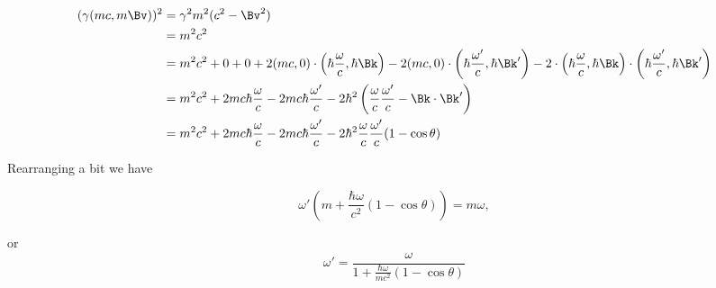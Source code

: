 \begin{align*}
(\gamma (m c, m \Bv) )^2 
&= \gamma^2 m^2 (c^2 - \Bv^2) \\
&= m^2 c^2 \\
&=
m^2 c^2 + 0 + 0
+ 2 (m c, 0) 
\cdot \left(\hbar \frac{\omega}{c}, \hbar \Bk \right)
- 2 (m c, 0) \cdot \left(\hbar \frac{\omega'}{c}, \hbar \Bk' \right)
- 2 
\cdot \left(\hbar \frac{\omega}{c}, \hbar \Bk \right)
\cdot \left(\hbar \frac{\omega'}{c}, \hbar \Bk' \right) \\
&=
m^2 c^2 + 2 m c \hbar \frac{\omega}{c} - 2 m c \hbar \frac{\omega'}{c}
- 2\hbar^2 \left(
\frac{\omega}{c} \frac{\omega'}{c}
- 
\Bk \cdot \Bk'
\right) \\
&=
m^2 c^2 + 2 m c \hbar \frac{\omega}{c} - 2 m c \hbar \frac{\omega'}{c}
- 2\hbar^2 
\frac{\omega}{c} \frac{\omega'}{c} (1 - \cos\theta)
\end{align*}

Rearranging a bit we have

\begin{equation}\label{eqn:relativisticElectrodynamicsExamReflection:430}
\omega' \left( m + \frac{\hbar \omega}{c^2} ( 1 - \cos\theta ) \right) = m \omega,
\end{equation}

or
\begin{equation}\label{eqn:relativisticElectrodynamicsExamReflection:450}
\omega' = \frac{\omega}{
1 + \frac{\hbar \omega}{m c^2} ( 1 - \cos\theta ) 
}
\end{equation}

\EndNoBibArticle
